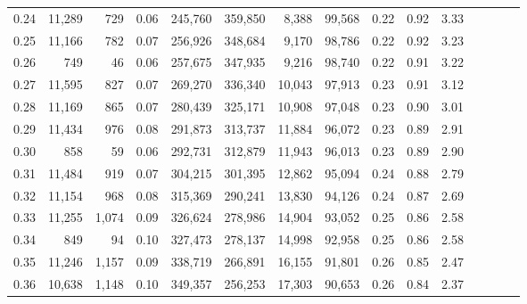 \begin{tabular}{rrrcrrrrrrrrrrr}
0.24 &  11,289 &     729 &                                       0.06 &  245,760 &  359,850 &    8,388 &   99,568 &  0.22 &  0.92 &                         3.33 \\
0.25 &  11,166 &     782 &                                       0.07 &  256,926 &  348,684 &    9,170 &   98,786 &  0.22 &  0.92 &                         3.23 \\
0.26 &     749 &      46 &                                       0.06 &  257,675 &  347,935 &    9,216 &   98,740 &  0.22 &  0.91 &                         3.22 \\
0.27 &  11,595 &     827 &                                       0.07 &  269,270 &  336,340 &   10,043 &   97,913 &  0.23 &  0.91 &                         3.12 \\
0.28 &  11,169 &     865 &                                       0.07 &  280,439 &  325,171 &   10,908 &   97,048 &  0.23 &  0.90 &                         3.01 \\
0.29 &  11,434 &     976 &                                       0.08 &  291,873 &  313,737 &   11,884 &   96,072 &  0.23 &  0.89 &                         2.91 \\
0.30 &     858 &      59 &                                       0.06 &  292,731 &  312,879 &   11,943 &   96,013 &  0.23 &  0.89 &                         2.90 \\
0.31 &  11,484 &     919 &                                       0.07 &  304,215 &  301,395 &   12,862 &   95,094 &  0.24 &  0.88 &                         2.79 \\
0.32 &  11,154 &     968 &                                       0.08 &  315,369 &  290,241 &   13,830 &   94,126 &  0.24 &  0.87 &                         2.69 \\
0.33 &  11,255 &   1,074 &                                       0.09 &  326,624 &  278,986 &   14,904 &   93,052 &  0.25 &  0.86 &                         2.58 \\
0.34 &     849 &      94 &                                       0.10 &  327,473 &  278,137 &   14,998 &   92,958 &  0.25 &  0.86 &                         2.58 \\
0.35 &  11,246 &   1,157 &                                       0.09 &  338,719 &  266,891 &   16,155 &   91,801 &  0.26 &  0.85 &                         2.47 \\
0.36 &  10,638 &   1,148 &                                       0.10 &  349,357 &  256,253 &   17,303 &   90,653 &  0.26 &  0.84 &                         2.37 \\

\end{tabular}
